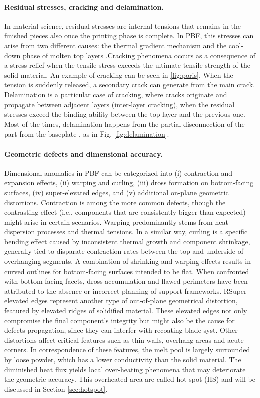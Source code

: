\paragraph{Residual stresses, cracking and delamination.} In material science, residual stresses are internal tensions that remains in the finished pieces also once the printing phase is complete. In PBF, this stresses can arise from two different causes: the thermal gradient mechanism and the cool-down phase of molten top layers \cite{mercelis_residual_2006}.Cracking phenomena occurs as a consequence of a stress relief when the tensile stress exceeds the ultimate tensile strength of the solid material. An example of cracking can be seen in \ref{fig:poris}. When the tension is suddenly released, a secondary crack can generate from the main crack. Delamination is a particular case of cracking, where cracks originate and propagate between adjacent layers (inter-layer cracking), when the residual stresses exceed the binding ability between the top layer and the previous one. Most of the times, delamination happens from the partial disconnection of the part from the baseplate \cite{sames_metallurgy_2016}, as in Fig. \ref{fig:delamination}.
\paragraph{Geometric defects and dimensional accuracy.} Dimensional anomalies in PBF can be categorized into (i) contraction and expansion effects, (ii) warping and curling, (iii) dross formation on bottom-facing surfaces, (iv) super-elevated edges, and (v) additional on-plane geometric distortions. Contraction is among the more common defects, though the contrasting effect (i.e., components that are consistently bigger than expected) might arise in certain scenarios. Warping predominantly stems from heat dispersion processes and thermal tensions. In a similar way, curling is a specific bending effect caused by inconsistent thermal growth and component shrinkage, generally tied to disparate contraction rates between the top and underside of overhanging segments. A combination of shrinking and warping effects results in curved outlines for bottom-facing surfaces intended to be flat. When confronted with bottom-facing facets, dross accumulation and flawed perimeters have been attributed to the absence or incorrect planning of support frameworks. RSuper-elevated edges represent another type of out-of-plane geometrical distortion, featured by elevated ridges of solidified material. These elevated edges not only compromise the final component's integrity but might also be the cause for defects propagation, since they can interfer with recoating blade syst. Other distortions affect critical features such as thin walls, overhang areas and acute corners. In correspondence of these features, the melt pool is largely surrounded by loose powder, which has a lower conductivity than the solid material. The diminished heat flux yields local over-heating phenomena that may deteriorate the geometric accuracy. This overheated area are called hot spot (HS) and will be discussed in Section \ref{sec:hotspot}.
